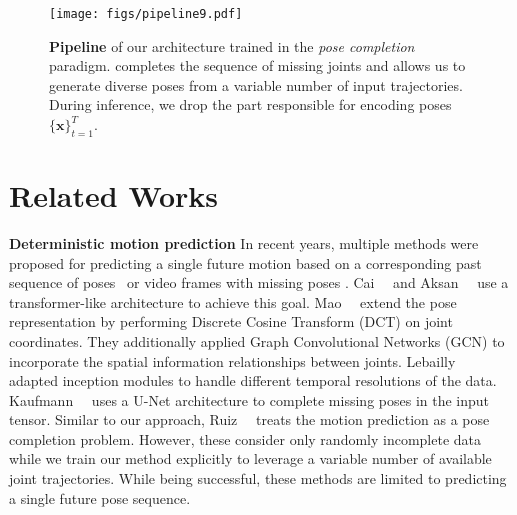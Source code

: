 \documentclass[10pt,twocolumn,letterpaper]{article}
\renewcommand{\paragraph}[1]{\noindent\textbf{#1}\enskip}
\begin{document}
\begin{figure*}
    \centering
    \texttt{[image: figs/pipeline9.pdf]}
    \caption{\textbf{Pipeline} of our \trajevae{} architecture trained in the \textit{pose completion} paradigm. \trajevae{} completes the sequence of missing joints and allows us to generate diverse poses from a variable number of input trajectories. During inference, we drop the part responsible for encoding poses $\{\mathbf{x}\}^T_{t=1}$.}
    \label{fig:pipeline}
    \vspace{-0.5em}
\end{figure*}


\section{Related Works}
\paragraph{Deterministic motion prediction} In recent years, multiple methods were proposed for predicting a single future motion based on a corresponding past sequence of poses~\cite{aksan2019structured, aksan2020attention, cai2020learning, cui2020learning, ghosh2017learning, gui2018adversarial, gopalakrishnan2019neural, gurumurthy2017deligan,li2018convolutional,li2020dynamic,mao2019learning,mao2020history,martinez2017human,pavllo2018quaternet,pavllo2019modeling,tang2018long} or video frames with missing poses \cite{martinez2017human, fragkiadaki2015recurrent,pavllo20193d, zhang2019predicting, kanazawa2019learning, iskakov2019learnable, zhang2021learning}. Cai~\etal~\cite{cai2020learning} and Aksan~\etal~\cite{aksan2020attention} use a transformer-like architecture to achieve this goal. Mao~\etal~\cite{mao2019learning,mao2020history} extend the pose representation by performing Discrete Cosine Transform (DCT) \cite{ahmed1974discrete} on joint coordinates. They additionally applied Graph Convolutional Networks (GCN) to incorporate the spatial information relationships between joints. Lebailly~\etal~\cite{lebailly2020motion} adapted inception modules \cite{szegedy2015going} to handle different temporal resolutions of the data. Kaufmann~\etal~\cite{kaufmann2020convolutional} uses a U-Net architecture to complete missing poses in the input tensor. Similar to our approach, Ruiz~\etal~\cite{hernandez2019human} treats the motion prediction as a pose completion problem. However, these  consider only randomly incomplete data while we train our method explicitly to leverage a variable number of available joint trajectories. While being successful, these methods are limited to predicting a single future pose sequence.
\end{document}
